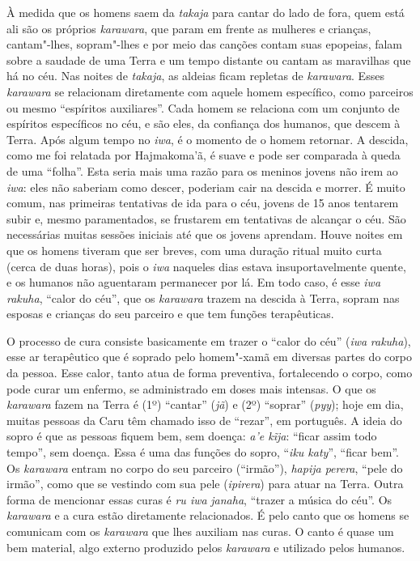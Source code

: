 À medida que os homens saem da \emph{takaja} para cantar do lado de
fora, quem está ali são os próprios \emph{karawara}, que param em frente
as mulheres e crianças, cantam"-lhes, sopram"-lhes e por meio das canções
contam suas epopeias, falam sobre a saudade de uma Terra e um tempo
distante ou cantam as maravilhas que há no céu. Nas noites de
\emph{takaja}, as aldeias ficam repletas de \emph{karawara}. Esses
\emph{karawara} se relacionam diretamente com aquele homem específico,
como parceiros ou mesmo ``espíritos auxiliares''. Cada homem se
relaciona com um conjunto de espíritos específicos no céu, e são eles,
da confiança dos humanos, que descem à Terra. Após algum tempo no
\emph{iwa}, é o momento de o homem retornar. A descida, como me foi
relatada por Hajmakoma'ã, é suave e pode ser comparada à queda de uma
``folha''. Esta seria mais uma razão para os meninos jovens não irem ao
\emph{iwa}: eles não saberiam como descer, poderiam cair na descida e
morrer. É muito comum, nas primeiras tentativas de ida para o céu,
jovens de 15 anos tentarem subir e, mesmo paramentados, se frustarem em
tentativas de alcançar o céu. São necessárias muitas sessões iniciais
até que os jovens aprendam. Houve noites em que os homens tiveram que
ser breves, com uma duração ritual muito curta (cerca de duas horas),
pois o \emph{iwa} naqueles dias estava insuportavelmente quente, e os
humanos não aguentaram permanecer por lá. Em todo caso, é esse \emph{iwa
rakuha}, ``calor do céu'', que os \emph{karawara} trazem na descida à
Terra, sopram nas esposas e crianças do seu parceiro e que tem funções
terapêuticas.

O processo de cura consiste basicamente em trazer o ``calor do céu''
(\emph{iwa} \emph{rakuha}), esse ar terapêutico que é soprado pelo
homem"-xamã em diversas partes do corpo da pessoa. Esse calor, tanto atua
de forma preventiva, fortalecendo o corpo, como pode curar um enfermo,
se administrado em doses mais intensas. O que os \emph{karawara} fazem
na Terra é (1º) ``cantar'' (\emph{jã}) e (2º) ``soprar'' (\emph{pyy});
hoje em dia, muitas pessoas da  Caru têm chamado isso de ``rezar'', em
português. A ideia do sopro é que as pessoas fiquem bem, sem doença:
\emph{a'e kĩja}: ``ficar assim todo tempo'', sem doença. Essa é uma das
funções do sopro, ``\emph{iku katy}'', ``ficar bem''. Os \emph{karawara}
entram no corpo do seu parceiro (``irmão''), \emph{hapija perera},
``pele do irmão'', como que se vestindo com sua pele (\emph{ipirera})
para atuar na Terra. Outra forma de mencionar essas curas é \emph{ru
iwa} \emph{janaha}, ``trazer a música do céu''. Os \emph{karawara} e a
cura estão diretamente relacionados. É pelo canto que os homens se
comunicam com os \emph{karawara} que lhes auxiliam nas curas. O canto é
quase um bem material, algo externo produzido pelos \emph{karawara} e
utilizado pelos humanos.

